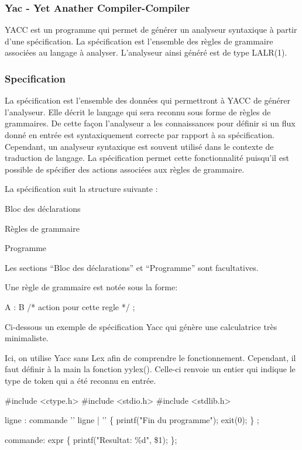 \documentclass{article}
\begin{document}
\subsubsection{Yac - Yet Anather Compiler-Compiler}
YACC est un programme qui permet de générer un analyseur syntaxique à partir d’une spécification. La spécification est l’ensemble des règles de grammaire associées au langage à analyser.
L’analyseur ainsi généré est de type LALR(1).

\subsubsection{Specification}
La spécification est l’ensemble des données qui permettront à YACC de générer l’analyseur. Elle décrit le langage qui sera reconnu sous forme de règles de grammaires. De cette façon l’analyseur a les connaissances pour définir si un flux donné en entrée est syntaxiquement correcte par rapport à sa spécification.
Cependant, un analyseur syntaxique est souvent utilisé dans le contexte de traduction de langage. La spécification permet cette fonctionnalité puisqu’il est possible de spécifier des actions associées aux règles de grammaire.

La spécification suit la structure suivante :

Bloc des déclarations


Règles de grammaire


Programme

Les sections “Bloc des déclarations” et “Programme” sont facultatives.

Une règle de grammaire est notée sous la forme:

A : B { /* action pour cette regle */ };

Ci-dessous un exemple de spécification Yacc qui génère une calculatrice très minimaliste.

Ici, on utilise Yacc sans Lex afin de comprendre le fonctionnement. Cependant, il faut définir à la main la fonction yylex(). Celle-ci renvoie un entier qui indique le type de token qui a été reconnu en entrée.

    \#include <ctype.h>
    \#include <stdio.h>
    \#include <stdlib.h>


ligne : commande '\n' ligne
    | '\n' \{ printf("Fin du programme\n"); exit(0); \}
    ;

commande: expr \{ printf("Resultat: \%d\n", \$1); \};
\end{document}
